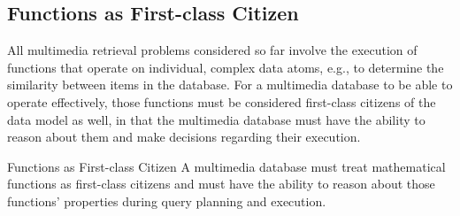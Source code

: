 \subsection{Functions as First-class Citizen}

All multimedia retrieval problems considered so far involve the execution of functions that operate on individual, complex data atoms, e.g., to determine the similarity between items in the database. For a multimedia database to be able to operate effectively, those functions must be considered first-class citizens of the data model as well, in that the multimedia database must have the ability to reason about them and make decisions regarding their execution.

\begin{requirement}{Functions as First-class Citizen}{}
    A multimedia database must treat mathematical functions as first-class citizens and must have the ability to reason about those functions' properties during query planning and execution.
\end{requirement}